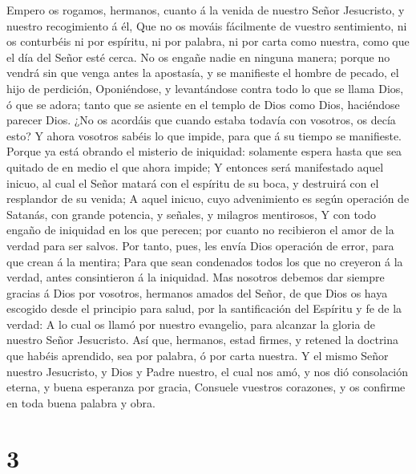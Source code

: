  Empero os rogamos, hermanos, cuanto á la venida de
nuestro Señor Jesucristo, y nuestro recogimiento á él, 
Que no os mováis fácilmente de vuestro sentimiento, ni os conturbéis ni
por espíritu, ni por palabra, ni por carta como nuestra, como que el día
del Señor esté cerca.  No os engañe nadie en ninguna
manera; porque no vendrá sin que venga antes la apostasía, y se
manifieste el hombre de pecado, el hijo de perdición, 
Oponiéndose, y levantándose contra todo lo que se llama Dios, ó que se
adora; tanto que se asiente en el templo de Dios como Dios, haciéndose
parecer Dios.  ¿No os acordáis que cuando estaba todavía
con vosotros, os decía esto?  Y ahora vosotros sabéis lo
que impide, para que á su tiempo se manifieste.  Porque ya
está obrando el misterio de iniquidad: solamente espera hasta que sea
quitado de en medio el que ahora impide;  Y entonces será
manifestado aquel inicuo, al cual el Señor matará con el espíritu de su
boca, y destruirá con el resplandor de su venida;  A aquel
inicuo, cuyo advenimiento es según operación de Satanás, con grande
potencia, y señales, y milagros mentirosos,  Y con todo
engaño de iniquidad en los que perecen; por cuanto no recibieron el amor
de la verdad para ser salvos.  Por tanto, pues, les envía
Dios operación de error, para que crean á la mentira; 
Para que sean condenados todos los que no creyeron á la verdad, antes
consintieron á la iniquidad.  Mas nosotros debemos dar
siempre gracias á Dios por vosotros, hermanos amados del Señor, de que
Dios os haya escogido desde el principio para salud, por la
santificación del Espíritu y fe de la verdad:  A lo cual
os llamó por nuestro evangelio, para alcanzar la gloria de nuestro Señor
Jesucristo.  Así que, hermanos, estad firmes, y retened
la doctrina que habéis aprendido, sea por palabra, ó por carta nuestra.
 Y el mismo Señor nuestro Jesucristo, y Dios y Padre
nuestro, el cual nos amó, y nos dió consolación eterna, y buena
esperanza por gracia,  Consuele vuestros corazones, y os
confirme en toda buena palabra y obra.

\hypertarget{section-2}{%
\section{3}\label{section-2}}

